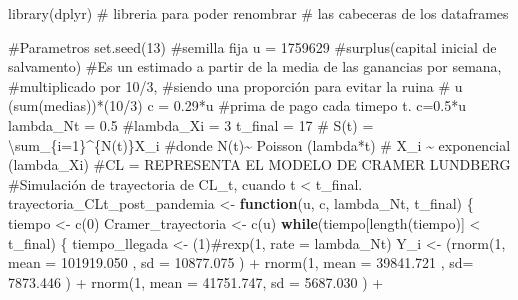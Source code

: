 \documentclass[
  us-letterpaper,
]{scrreprt}
\newenvironment{Shaded}{\begin{snugshade}}{\end{snugshade}}
\newcommand{\AttributeTok}[1]{\textcolor[rgb]{0.40,0.45,0.13}{#1}}
\newcommand{\CommentTok}[1]{\textcolor[rgb]{0.37,0.37,0.37}{#1}}
\newcommand{\ControlFlowTok}[1]{\textcolor[rgb]{0.00,0.23,0.31}{\textbf{#1}}}
\newcommand{\DecValTok}[1]{\textcolor[rgb]{0.68,0.00,0.00}{#1}}
\newcommand{\FloatTok}[1]{\textcolor[rgb]{0.68,0.00,0.00}{#1}}
\newcommand{\FunctionTok}[1]{\textcolor[rgb]{0.28,0.35,0.67}{#1}}
\newcommand{\NormalTok}[1]{\textcolor[rgb]{0.00,0.23,0.31}{#1}}
\newcommand{\OtherTok}[1]{\textcolor[rgb]{0.00,0.23,0.31}{#1}}
\newcommand{\SpecialCharTok}[1]{\textcolor[rgb]{0.37,0.37,0.37}{#1}}
\theoremstyle{definition}
\theoremstyle{plain}
\theoremstyle{plain}
\theoremstyle{remark}
\begin{document}
\begin{Shaded}
\begin{Highlighting}[]
\FunctionTok{library}\NormalTok{(dplyr) }\CommentTok{\# libreria para poder renombrar }
\CommentTok{\# las cabeceras de los dataframes}

\CommentTok{\#Parametros}
\FunctionTok{set.seed}\NormalTok{(}\DecValTok{13}\NormalTok{) }\CommentTok{\#semilla fija}
\NormalTok{u }\OtherTok{=} \DecValTok{1759629} \CommentTok{\#surplus(capital inicial de salvamento)}
\CommentTok{\#Es un estimado a partir de la media de las ganancias por semana, }
\CommentTok{\#multiplicado por 10/3, }
\CommentTok{\#siendo una proporción para evitar la ruina}
\CommentTok{\# u (sum(medias))*(10/3)}
\NormalTok{c }\OtherTok{=} \FloatTok{0.29}\SpecialCharTok{*}\NormalTok{u }\CommentTok{\#prima de pago cada timepo t. c=0.5*u}
\NormalTok{lambda\_Nt }\OtherTok{=} \FloatTok{0.5}
\CommentTok{\#lambda\_Xi = 3}
\NormalTok{t\_final }\OtherTok{=} \DecValTok{17}
\CommentTok{\# S(t) = \textbackslash{}sum\_\{i=1\}\^{}\{N(t)\}X\_i}
\CommentTok{\#donde N(t)\textasciitilde{} Poisson (lambda*t)}
\CommentTok{\# X\_i \textasciitilde{} exponencial (lambda\_Xi)}
\CommentTok{\#CL = REPRESENTA EL MODELO DE CRAMER LUNDBERG}
\CommentTok{\#Simulación de trayectoria de CL\_t, cuando t \textless{} t\_final.}
\NormalTok{trayectoria\_CLt\_post\_pandemia }\OtherTok{\textless{}{-}} \ControlFlowTok{function}\NormalTok{(u, c, lambda\_Nt, t\_final)}
\NormalTok{\{}
\NormalTok{  tiempo }\OtherTok{\textless{}{-}} \FunctionTok{c}\NormalTok{(}\DecValTok{0}\NormalTok{)}
\NormalTok{  Cramer\_trayectoria }\OtherTok{\textless{}{-}} \FunctionTok{c}\NormalTok{(u)}
  \ControlFlowTok{while}\NormalTok{(tiempo[}\FunctionTok{length}\NormalTok{(tiempo)] }\SpecialCharTok{\textless{}}\NormalTok{ t\_final)}
\NormalTok{  \{}
\NormalTok{    tiempo\_llegada }\OtherTok{\textless{}{-}}\NormalTok{ (}\DecValTok{1}\NormalTok{)}\CommentTok{\#rexp(1, rate = lambda\_Nt)}
\NormalTok{    Y\_i }\OtherTok{\textless{}{-}}\NormalTok{  (}\FunctionTok{rnorm}\NormalTok{(}\DecValTok{1}\NormalTok{, }\AttributeTok{mean =} \FloatTok{101919.050}\NormalTok{ , }\AttributeTok{sd =} \FloatTok{10877.075}\NormalTok{  ) }
\SpecialCharTok{+} \FunctionTok{rnorm}\NormalTok{(}\DecValTok{1}\NormalTok{, }\AttributeTok{mean =}  \FloatTok{39841.721}\NormalTok{ , }\AttributeTok{sd=} \FloatTok{7873.446} 
\NormalTok{    ) }\SpecialCharTok{+}  
\FunctionTok{rnorm}\NormalTok{(}\DecValTok{1}\NormalTok{, }\AttributeTok{mean =}   \FloatTok{41751.747}\NormalTok{, }\AttributeTok{sd =} \FloatTok{5687.030}\NormalTok{  ) }\SpecialCharTok{+} 

\end{Highlighting}
\end{Shaded}
\end{document}
